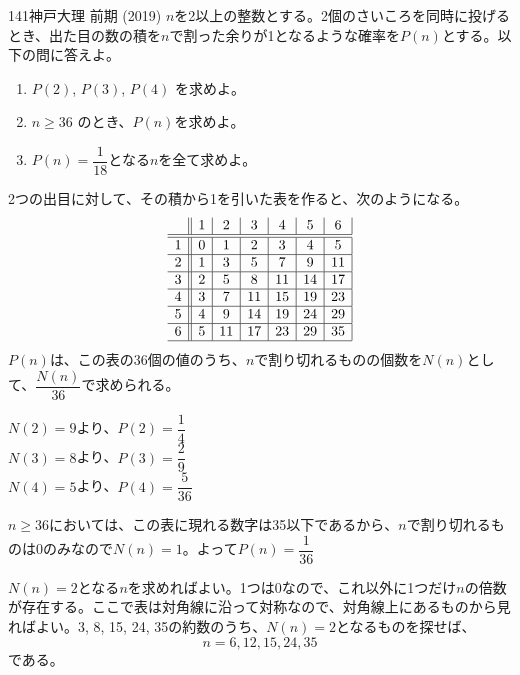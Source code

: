 \begin{prob}{141}{}{神戸大理 前期 (2019)}
 $n$を2以上の整数とする。2個のさいころを同時に投げるとき、出た目の数の積を$n$で割った余りが1となるような確率を$P(n)$とする。以下の問に答えよ。
 \begin{enumerate}
  \item $P(2)$, $P(3)$, $P(4)$ を求めよ。
  \item $n\ge 36$ のとき、$P(n)$を求めよ。
  \item $P(n)=\dfrac{1}{18}$となる$n$を全て求めよ。
 \end{enumerate}
\end{prob}

2つの出目に対して、その積から1を引いた表を作ると、次のようになる。
\begin{align*}
 \begin{array}{c||c|c|c|c|c|c|}
    & 1 & 2 & 3 & 4 & 5 & 6 \\ \hline\hline
  1 & 0 & 1 & 2 & 3 & 4 & 5 \\ \hline
  2 & 1 & 3 & 5 & 7 & 9 & 11\\ \hline
  3 & 2 & 5 & 8 & 11& 14& 17\\ \hline
  4 & 3 & 7 & 11& 15& 19& 23\\ \hline
  5 & 4 & 9 & 14& 19& 24& 29\\ \hline
  6 & 5 & 11& 17& 23& 29& 35\\ \hline
 \end{array}
\end{align*}
$P(n)$は、この表の36個の値のうち、$n$で割り切れるものの個数を$N(n)$として、$\dfrac{N(n)}{36}$で求められる。

$N(2)=9$より、$P(2)=\dfrac{1}{4}$ \\
$N(3)=8$より、$P(3)=\dfrac{2}{9}$ \\
$N(4)=5$より、$P(4)=\dfrac{5}{36}$

$n\ge 36$においては、この表に現れる数字は35以下であるから、$n$で割り切れるものは0のみなので$N(n)=1$。よって$P(n)=\dfrac{1}{36}$

$N(n)=2$となる$n$を求めればよい。1つは0なので、これ以外に1つだけ$n$の倍数が存在する。ここで表は対角線に沿って対称なので、対角線上にあるものから見ればよい。3, 8, 15, 24, 35の約数のうち、$N(n)=2$となるものを探せば、
\[ n=6, 12, 15, 24, 35 \]
である。